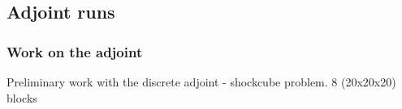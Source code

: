 \documentclass{beamer}
\begin{document}
\subsection{Adjoint runs}
\begin{frame}
\frametitle{Work on the adjoint}
\begin{minipage}[t][1\textheight]{1\textwidth}
\vspace{-20pt}
\begin{exampleblock}{Preliminary work with the discrete adjoint - shockcube problem. 8 (20x20x20) blocks}
\vspace{-20pt}
\tiny
\begin{figure}
\label{fig:shockedcube}
\centering
{}

\end{figure}
\end{exampleblock}
\end{minipage}
\end{frame}
\end{document}
